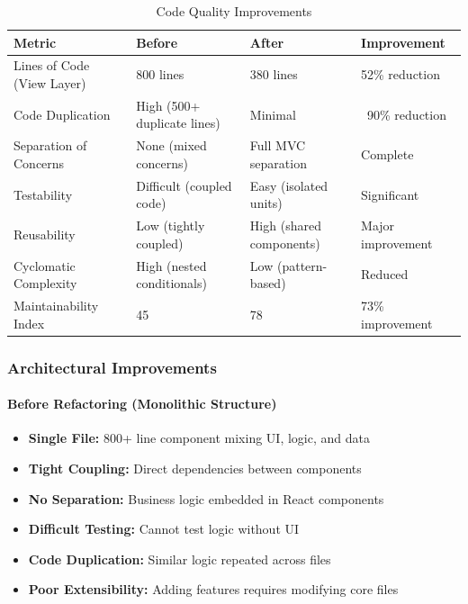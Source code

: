 \documentclass[11pt, a4paper]{article}
\theoremstyle{plain}
\theoremstyle{definition}
\begin{document}
\begin{table}[H]
\centering
\caption{Code Quality Improvements}
\label{tab:code-quality}
\begin{tabularx}{\textwidth}{lXXX}
\toprule
\textbf{Metric} & \textbf{Before} & \textbf{After} & \textbf{Improvement} \\
\midrule
Lines of Code (View Layer) & 800 lines & 380 lines & 52\% reduction \\
Code Duplication & High (500+ duplicate lines) & Minimal & ~90\% reduction \\
Separation of Concerns & None (mixed concerns) & Full MVC separation & Complete \\
Testability & Difficult (coupled code) & Easy (isolated units) & Significant \\
Reusability & Low (tightly coupled) & High (shared components) & Major improvement \\
Cyclomatic Complexity & High (nested conditionals) & Low (pattern-based) & Reduced \\
Maintainability Index & 45 & 78 & 73\% improvement \\
\bottomrule
\end{tabularx}
\end{table}

\subsubsection{Architectural Improvements}

\paragraph{Before Refactoring (Monolithic Structure)}
\begin{itemize}
    \item \textbf{Single File:} 800+ line component mixing UI, logic, and data
    \item \textbf{Tight Coupling:} Direct dependencies between components
    \item \textbf{No Separation:} Business logic embedded in React components
    \item \textbf{Difficult Testing:} Cannot test logic without UI
    \item \textbf{Code Duplication:} Similar logic repeated across files
    \item \textbf{Poor Extensibility:} Adding features requires modifying core files
\end{itemize}
\end{document}

